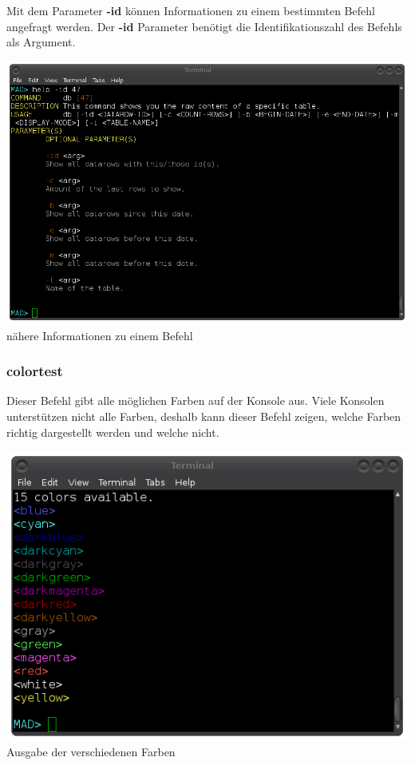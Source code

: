 \documentclass[12pt,a4paper]{report}
\begin{document}
\begin{onehalfspace}
Mit dem Parameter \textbf{-id} können Informationen zu einem bestimmten Befehl angefragt werden. Der \textbf{-id} Parameter benötigt die Identifikationszahl des Befehls als Argument.

\begin{center}
\includegraphics[scale=0.5]{img/cli_help_id.png}\\
nähere Informationen zu einem Befehl
\end{center}

\subsubsection{colortest}

Dieser Befehl gibt alle möglichen Farben auf der Konsole aus. Viele Konsolen unterstützen nicht alle Farben, deshalb kann dieser Befehl zeigen, welche Farben richtig dargestellt werden und welche nicht.

\begin{center}
\includegraphics[scale=0.5]{img/cli_colortest.png}\\
Ausgabe der verschiedenen Farben
\end{center}


\end{onehalfspace}
\end{document}
